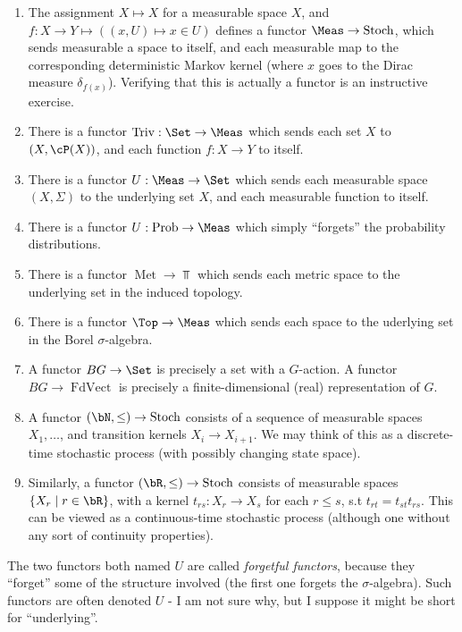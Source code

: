 \documentclass{article}
\DeclareMathOperator{\Met}{Met}
\DeclareMathOperator{\FdVect}{FdVect}
\DeclareMathOperator{\Stoch}{Stoch}
\DeclareMathOperator{\Prob}{Prob}
\DeclareMathOperator{\Triv}{Triv}
\begin{document}
\begin{example}
    \begin{enumerate}
    \item The assignment $X \mapsto X$ for a measurable space $X$, and $f: X \to Y \mapsto ((x,U) \mapsto x \in U)$ defines a functor $\Meas \to \Stoch$,
    which sends measurable a space to itself, and each measurable map to the corresponding deterministic Markov kernel (where $x$ goes to the Dirac measure $\delta_{f(x)}$).
    Verifying that this is actually a functor is an instructive exercise.
    \item There is a functor $\Triv: \Set \to \Meas$ which sends each set $X$ to $(X,\cP(X))$, and each function $f: X \to Y$ to itself.
    \item There is a functor $U: \Meas \to \Set$ which sends each measurable space $(X,\Sigma)$ to the underlying set $X$, and each measurable function to itself.
    \item There is a functor $U: \Prob \to \Meas$ which simply ``forgets'' the probability distributions.
    \item There is a functor $\Met \to \Top$ which sends each metric space to the underlying set in the induced topology.
    \item There is a functor $\Top \to \Meas$ which sends each space to the uderlying set in the Borel $\sigma$-algebra.
    \item A functor $BG \to \Set$ is precisely a set with a $G$-action. A functor $BG \to \FdVect$ is precisely a finite-dimensional (real) representation of $G$.
    \item A functor $(\bN,\leq) \to \Stoch$ consists of a sequence of measurable spaces $X_1, \dots$, and transition kernels $X_i \to X_{i+1}$. We may think of this as a discrete-time stochastic process (with possibly changing state space).
    \item Similarly, a functor $(\bR,\leq) \to \Stoch$ consists of measurable spaces $\{X_r \mid r \in \bR\}$,
    with a kernel $t_{rs}: X_r \to X_s$ for each $r \leq s$, s.t $t_{rt} = t_{st}t_{rs}$.
    This can be viewed as a continuous-time stochastic process (although one without any sort of continuity properties).
    \end{enumerate}
\end{example}
The two functors both named $U$ are called \emph{forgetful functors}, because they ``forget'' some of the structure involved (the first one forgets the $\sigma$-algebra).
Such functors are often denoted $U$ - I am not sure why, but I suppose it might be short for ``underlying''.
\end{document}
